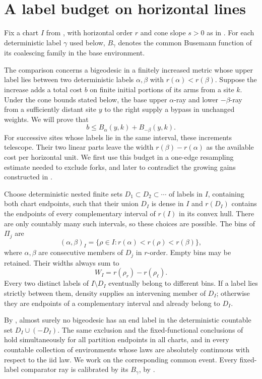 \section{A label budget on horizontal lines}\label{sec:budget}

Fix a chart $I$ from , with horizontal order $r$ and
cone slope $s>0$ as in . For each deterministic label
$\gamma$ used below, $B_\gamma$ denotes the common Busemann function
of its coalescing family in the base environment.

The comparison concerns a bigeodesic in a finitely increased metric
whose upper label lies between two deterministic labels $\alpha,\beta$
with $r(\alpha)<r(\beta)$.
Suppose the increase adds a total cost $b$ on finite initial portions of
its arms from a site $k$. Under the cone bounds stated below, the base
upper $\alpha$-ray and lower $-\beta$-ray from a sufficiently distant
site $y$ to the right supply a bypass in unchanged weights. We will prove
that
\[
 b\le B_\alpha(y,k)+B_{-\beta}(y,k).
\]
For successive sites whose labels lie in the same interval, these
increments telescope. Their two linear parts leave the width
$r(\beta)-r(\alpha)$ as the available cost per horizontal unit.
We first use this budget in a one-edge resampling estimate needed to
exclude forks, and later to contradict the growing gains constructed in
.

Choose deterministic nested finite sets $D_1\subset D_2\subset\cdots$
of labels in $I$, containing both chart endpoints, such that their union
$D_I$ is dense in $I$ and $r(D_I)$ contains the endpoints of every
complementary interval of $r(I)$ in its convex hull. There are only
countably many such intervals, so these choices are possible. The bins
of $\Pi_j$ are
\[
 (\alpha,\beta)_I
   =\{\rho\in I:r(\alpha)<r(\rho)<r(\beta)\},
\]
where $\alpha,\beta$ are consecutive members of $D_j$ in $r$-order.
Empty bins may be retained. Their widths always sum to
\begin{equation}\label{eq:chart-width}
 W_I=r(\rho_r)-r(\rho_\ell).
\end{equation}
Every two distinct labels of $I\setminus D_I$ eventually belong to
different bins. If a label lies strictly between them, density supplies
an intervening member of $D_I$; otherwise they are endpoints of a
complementary interval and already belong to $D_I$.

By , almost surely no bigeodesic has an end label
in the deterministic countable set $D_I\cup(-D_I)$. The same exclusion
and the fixed-functional conclusions of  hold
simultaneously for all partition endpoints in all charts, and in every
countable collection of environments whose laws are absolutely
continuous with respect to the iid law. We work on the corresponding
common event. Every fixed-label comparator ray is calibrated by its
$B_\gamma$, by .


